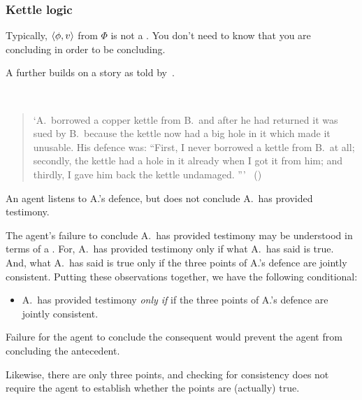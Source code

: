 \subsubsection{Kettle logic}
\label{sec:failures-1}

\begin{note}
  Typically, \(\langle \phi, v \rangle\) from \(\Phi\) is not a \requ{}.
  You don't need to know that you are concluding in order to be concluding.
\end{note}

\begin{note}
  A further  builds on a story as told by~\citeauthor{Freud:1960wx}.
  \begin{illustration}
    \label{illu:kettle}
    \mbox{ }
    \vspace{-\baselineskip}
    \begin{quote}
      `A.\ borrowed a copper kettle from B.\ and after he had returned it was sued by B.\ because the kettle now had a big hole in it which made it unusable.
      His defence was:
      ``First, I never borrowed a kettle from B.\ at all;
      secondly, the kettle had a hole in it already when I got it from him;
      and thirdly, I gave him back the kettle undamaged.%
      '''\newline
      \mbox{ }\hfill\mbox{(\citeyear[62]{Freud:1960wx})}
    \end{quote}
    An agent listens to A.'s defence, but does not conclude A.\ has provided testimony.
  \end{illustration}

  The agent's failure to conclude A.\ has provided testimony may be understood in terms of a \requ{}.
  For, A.\ has provided testimony only if what A.\ has said is true.
  And, what A.\ has said is true only if the three points of A.'s defence are jointly consistent.
  Putting these observations together, we have the following conditional:

  \begin{itemize}
  \item
    A.\ has provided testimony \emph{only if} if the three points of A.'s defence are jointly consistent.
  \end{itemize}

  Failure for the agent to conclude the consequent would prevent the agent from concluding the antecedent.

  Likewise, there are only three points, and checking for consistency does not require the agent to establish whether the points are (actually) true.


\end{note}
